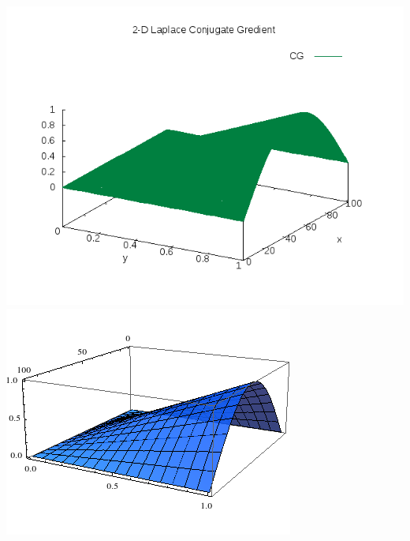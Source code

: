 \documentclass[12pt,a4paper]{report}
\begin{document}
\centering
\includegraphics[scale=.8]{plot-1.png} 
\includegraphics[scale=.8]{analytic.png} 
\end{document}
